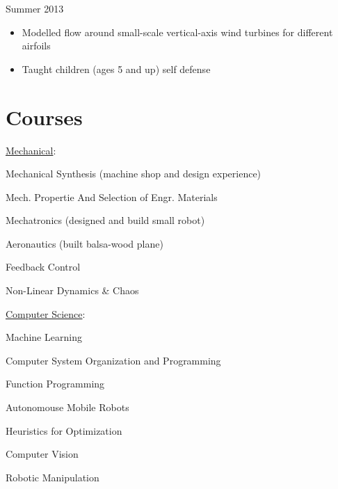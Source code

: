 \documentclass{BradyResume}
\begin{document}
%
           {Summer 2013}
\begin{itemize}
  \item Modelled flow around small-scale vertical-axis wind turbines for different airfoils
\end{itemize}

\begin{itemize}
  \item Taught children (ages 5 and up) self defense
\end{itemize}

\section*{Courses}
\uline{Mechanical}:%
\begin{pipelist}
    \item Mechanical Synthesis (machine shop and design experience) 
    \item Mech. Propertie And Selection of Engr. Materials 
    \item Mechatronics (designed and build small robot) 
    \item Aeronautics (built balsa-wood plane) 
    \item Feedback Control 
    \item Non-Linear Dynamics \& Chaos 
\end{pipelist}
%
\uline{Computer Science}:%
\begin{pipelist}
    \item Machine Learning 
    \item Computer System Organization and Programming 
    \item Function Programming 
    \item Autonomouse Mobile Robots 
    \item Heuristics for Optimization 
    \item Computer Vision 
    \item Robotic Manipulation
\end{pipelist}
\end{document}
